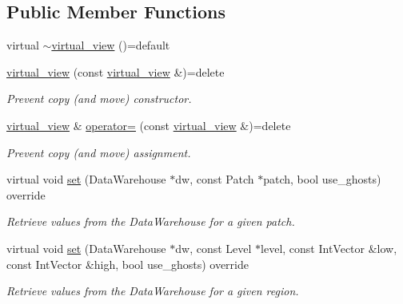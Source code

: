 \subsection*{Public Member Functions}
\begin{DoxyCompactItemize}
\item 
virtual \hyperlink{classUintah_1_1PhaseField_1_1detail_1_1virtual__view_3_01View_00_01ScalarField_3_01T_01_4_01_4_af5b408c272dd86037d299bb56cacb611}{$\sim$virtual\+\_\+view} ()=default
\item 
\hyperlink{classUintah_1_1PhaseField_1_1detail_1_1virtual__view_3_01View_00_01ScalarField_3_01T_01_4_01_4_a4c1a74f741bc473ac3caeae0a3479936}{virtual\+\_\+view} (const \hyperlink{classUintah_1_1PhaseField_1_1detail_1_1virtual__view}{virtual\+\_\+view} \&)=delete
\begin{DoxyCompactList}\small\item\em Prevent copy (and move) constructor. \end{DoxyCompactList}\item 
\hyperlink{classUintah_1_1PhaseField_1_1detail_1_1virtual__view}{virtual\+\_\+view} \& \hyperlink{classUintah_1_1PhaseField_1_1detail_1_1virtual__view_3_01View_00_01ScalarField_3_01T_01_4_01_4_ac276fba9d0f6c717514d2087367c8ef1}{operator=} (const \hyperlink{classUintah_1_1PhaseField_1_1detail_1_1virtual__view}{virtual\+\_\+view} \&)=delete
\begin{DoxyCompactList}\small\item\em Prevent copy (and move) assignment. \end{DoxyCompactList}\item 
virtual void \hyperlink{classUintah_1_1PhaseField_1_1detail_1_1virtual__view_3_01View_00_01ScalarField_3_01T_01_4_01_4_af43741ba7c056b90119a666433d230c9}{set} (Data\+Warehouse $\ast$dw, const Patch $\ast$patch, bool use\+\_\+ghosts) override
\begin{DoxyCompactList}\small\item\em Retrieve values from the Data\+Warehouse for a given patch. \end{DoxyCompactList}\item 
virtual void \hyperlink{classUintah_1_1PhaseField_1_1detail_1_1virtual__view_3_01View_00_01ScalarField_3_01T_01_4_01_4_a7e6f5f192b3d8d5e056485817648685b}{set} (Data\+Warehouse $\ast$dw, const Level $\ast$level, const Int\+Vector \&low, const Int\+Vector \&high, bool use\+\_\+ghosts) override
\begin{DoxyCompactList}\small\item\em Retrieve values from the Data\+Warehouse for a given region. \end{DoxyCompactList}\item 

\end{DoxyCompactItemize}
